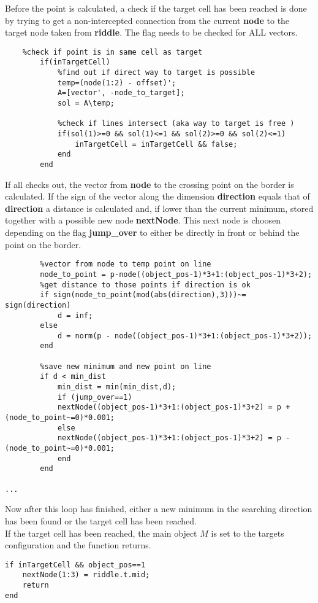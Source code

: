 Before the point is calculated, a check if the target cell has been reached is done by trying to get a non-intercepted connection from the current \textbf{node} to the target node taken from \textbf{riddle}. The flag needs to be checked for ALL vectors.       
\begin{lstlisting}
    %check if point is in same cell as target
        if(inTargetCell)
            %find out if direct way to target is possible
            temp=(node(1:2) - offset)';
            A=[vector', -node_to_target];
            sol = A\temp;
            
            %check if lines intersect (aka way to target is free )
            if(sol(1)>=0 && sol(1)<=1 && sol(2)>=0 && sol(2)<=1)
                inTargetCell = inTargetCell && false;
            end    
        end
\end{lstlisting}
If all checks out, the vector from \textbf{node} to the crossing point on the border is calculated. If the sign of the vector along the dimension \textbf{direction} equals that of \textbf{direction} a distance is calculated and, if lower than the current minimum, stored together with a possible new node \textbf{nextNode}.
This next node is choosen depending on the flag \textbf{jump\_over} to either be directly in front or behind the point on the border.
\begin{lstlisting}
        %vector from node to temp point on line
        node_to_point = p-node((object_pos-1)*3+1:(object_pos-1)*3+2);
        %get distance to those points if direction is ok
        if sign(node_to_point(mod(abs(direction),3)))~= sign(direction)
            d = inf;
        else
            d = norm(p - node((object_pos-1)*3+1:(object_pos-1)*3+2));
        end
        
        %save new minimum and new point on line
        if d < min_dist
            min_dist = min(min_dist,d);
            if (jump_over==1)
            nextNode((object_pos-1)*3+1:(object_pos-1)*3+2) = p + (node_to_point~=0)*0.001;
            else
            nextNode((object_pos-1)*3+1:(object_pos-1)*3+2) = p - (node_to_point~=0)*0.001;
            end
        end
        
...
\end{lstlisting}
Now after this loop has finished, either a new minimum in the searching direction has been found or the target cell has been reached. \\
If the target cell has been reached, the main object $M$ is set to the targets configuration and the function returns.
\begin{lstlisting}
if inTargetCell && object_pos==1
    nextNode(1:3) = riddle.t.mid;
    return
end
\end{lstlisting}
